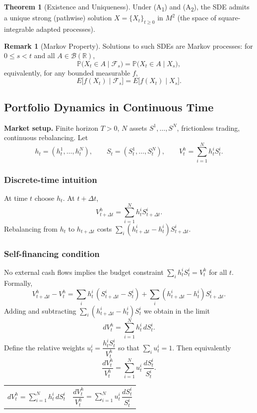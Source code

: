 \documentclass[12pt,a4paper]{article}
\theoremstyle{definition}
\newtheorem{theorem}{Theorem}[section]
\newtheorem{remark}{Remark}[section]
\newcommand{\R}{\mathbb{R}}
\newcommand{\Prob}{\mathbb{P}}
\begin{document}
\begin{theorem}[Existence and Uniqueness]
Under (A\textsubscript{1}) and (A\textsubscript{2}), the SDE admits a unique strong (pathwise) solution $X = \{X_t\}_{t\ge 0}$ in $M^2$ (the space of square-integrable adapted processes).
\end{theorem}

\begin{remark}[Markov Property]
Solutions to such SDEs are Markov processes: for $0\le s<t$ and all $A\in\mathcal{B}(\R)$,
\[
 \Prob\big(X_t\in A\mid \mathcal{F}_s\big) = \Prob\big(X_t\in A\mid X_s\big),
\]
equivalently, for any bounded measurable $f$,
\[
 E\big[f(X_t)\mid \mathcal{F}_s\big] = E\big[f(X_t)\mid X_s\big].
\]
\end{remark}

\subsection{Portfolio Dynamics in Continuous Time}

\textbf{Market setup.} Finite horizon $T>0$, $N$ assets $S^1,\dots,S^N$, frictionless trading, continuous rebalancing. Let
\[
 h_t = (h_t^1,\dots,h_t^N), \qquad S_t=(S_t^1,\dots,S_t^N), \qquad V_t^h = \sum_{i=1}^N h_t^i S_t^i.
\]

\subsubsection*{Discrete-time intuition}
At time $t$ choose $h_t$. At $t+\Delta t$,
\[
 V_{t+\Delta t}^h = \sum_{i=1}^N h_t^i S_{t+\Delta t}^i.
\]
Rebalancing from $h_t$ to $h_{t+\Delta t}$ costs $\sum_i (h_{t+\Delta t}^i-h_t^i) S_{t+\Delta t}^i$.

\subsubsection*{Self-financing condition}
No external cash flows implies the budget constraint $\sum_i h_t^i S_t^i = V_t^h$ for all $t$. Formally,
\[
 V_{t+\Delta t}^h - V_t^h = \sum_i h_t^i\,(S_{t+\Delta t}^i-S_t^i) + \sum_i (h_{t+\Delta t}^i-h_t^i) S_{t+\Delta t}^i.
\]
Adding and subtracting $\sum_i (h_{t+\Delta t}^i-h_t^i) S_t^i$ we obtain in the limit
\[
 dV_t^h = \sum_{i=1}^N h_t^i\, dS_t^i.
\]
Define the relative weights $u_t^i = \dfrac{h_t^i S_t^i}{V_t^h}$ so that $\sum_i u_t^i = 1$. Then equivalently
\[
 \frac{dV_t^h}{V_t^h} = \sum_{i=1}^N u_t^i\, \frac{dS_t^i}{S_t^i}.
\]

\begin{center}
\begin{tabular}{p{} p{}}
\centering \( dV_t^h = \sum\limits_{i=1}^N h_t^i\, dS_t^i \) & \centering \( \dfrac{dV_t^h}{V_t^h} = \sum\limits_{i=1}^N u_t^i\, \dfrac{dS_t^i}{S_t^i} \) \\
\end{tabular}
\end{center}
\end{document}

